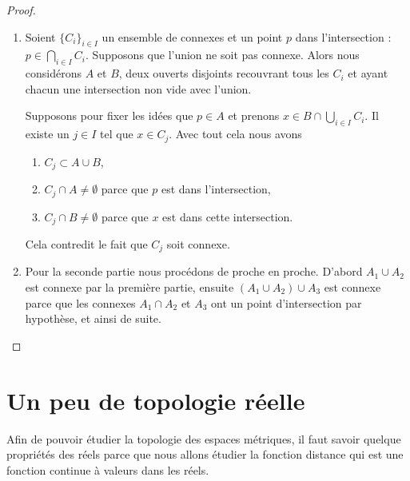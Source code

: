 \begin{proof}
    \begin{enumerate}
        \item
    Soient \( \{ C_i \}_{i\in I}\) un ensemble de connexes et un point \( p\) dans l'intersection : \( p\in\bigcap_{i\in I}C_i\). Supposons que l'union ne soit pas connexe. Alors nous considérons \( A\) et \( B\), deux ouverts disjoints recouvrant tous les \( C_i\) et ayant chacun une intersection non vide avec l'union.

    Supposons pour fixer les idées que \( p\in A\) et prenons \( x\in B\cap\bigcup_{i\in I}C_i\). Il existe un \( j\in I\) tel que \( x\in C_j\). Avec tout cela nous avons
    \begin{enumerate}
        \item
            \( C_j\subset A\cup B\),
        \item
            \( C_j\cap A\neq \emptyset\) parce que \( p\) est dans l'intersection,
        \item
            \( C_j\cap B\neq\emptyset\) parce que \( x\) est dans cette intersection.
    \end{enumerate}
    Cela contredit le fait que \( C_j\) soit connexe.

\item

    Pour la seconde partie nous procédons de proche en proche. D'abord \( A_1\cup A_2\) est connexe par la première partie, ensuite \( (A_1\cup A_2)\cup A_3\) est connexe parce que les connexes \( A_1\cap A_2\) et \( A_3\) ont un point d'intersection par hypothèse, et ainsi de suite.
    \end{enumerate}
\end{proof}
\section{Un peu de topologie réelle}

Afin de pouvoir étudier la topologie des espaces métriques, il faut savoir quelque propriétés des réels parce que nous allons étudier la fonction distance qui est une fonction continue à valeurs dans les réels.

